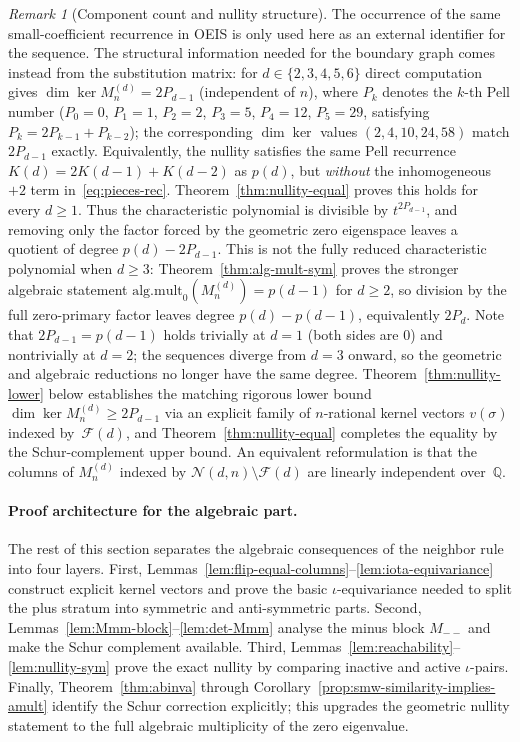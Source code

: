 \documentclass{amsart}
\theoremstyle{definition}
\theoremstyle{remark}
\newtheorem{remark}[theorem]{Remark}
\begin{document}
\begin{remark}[Component count and nullity structure]
\label{rem:nullity-structure}
The occurrence of the same small-coefficient recurrence in OEIS is
only used here as an external identifier for the sequence.  The
structural information needed for the boundary graph comes instead
from the substitution matrix:
for $d \in \{2, 3, 4, 5, 6\}$ direct computation gives
$\dim\ker M_n^{(d)} = 2 P_{d-1}$
\textup{(}independent of $n$\textup{)}, where
$P_k$ denotes the $k$-th Pell number
\textup{(}$P_0 = 0$, $P_1 = 1$, $P_2 = 2$, $P_3 = 5$,
$P_4 = 12$, $P_5 = 29$, satisfying $P_k = 2 P_{k-1} + P_{k-2}$\textup{)};
the corresponding $\dim\ker$ values $(2, 4, 10, 24, 58)$ match
$2 P_{d-1}$ exactly\@.  Equivalently, the nullity
satisfies the same Pell recurrence
$K(d) = 2 K(d{-}1) + K(d{-}2)$ as $p(d)$, but \emph{without} the
inhomogeneous $+2$ term in~\eqref{eq:pieces-rec}.  Theorem~\ref{thm:nullity-equal}
proves this holds for every $d \ge 1$.  Thus the characteristic
polynomial is divisible by $t^{2P_{d-1}}$, and removing only the
factor forced by the geometric zero eigenspace leaves a quotient
of degree $p(d) - 2 P_{d-1}$.  This is not the fully reduced
characteristic polynomial when $d \ge 3$: Theorem~\ref{thm:alg-mult-sym}
proves the stronger algebraic statement
$\mathrm{alg.mult}_0(M_n^{(d)})=p(d{-}1)$ for $d \ge 2$, so
division by the full zero-primary factor leaves degree
$p(d)-p(d{-}1)$, equivalently $2 P_d$.  Note that $2 P_{d-1} = p(d{-}1)$ holds
trivially at $d = 1$ (both sides are $0$) and nontrivially at
$d = 2$; the sequences diverge from $d = 3$ onward, so the
geometric and algebraic reductions no longer have the same
degree.
Theorem~\ref{thm:nullity-lower} below establishes the matching
rigorous lower bound $\dim \ker M_n^{(d)} \ge 2 P_{d-1}$ via
an explicit family of $n$-rational kernel vectors $v(\sigma)$
indexed by~$\mathcal{F}(d)$, and Theorem~\ref{thm:nullity-equal}
completes the equality by the Schur-complement upper bound.  An
equivalent reformulation is that the columns of $M_n^{(d)}$
indexed by $\mathcal{N}(d, n) \setminus \mathcal{F}(d)$ are
linearly independent over~$\mathbb{Q}$.
\end{remark}

\paragraph{Proof architecture for the algebraic part.}
The rest of this section separates the algebraic consequences of
the neighbor rule into four layers.  First, Lemmas~\ref{lem:flip-equal-columns}--\ref{lem:iota-equivariance}
construct explicit kernel vectors and prove the basic
$\iota$-equivariance needed to split the plus stratum into
symmetric and anti-symmetric parts.  Second,
Lemmas~\ref{lem:Mmm-block}--\ref{lem:det-Mmm} analyse the
minus block $M_{--}$ and make the Schur complement available.
Third, Lemmas~\ref{lem:reachability}--\ref{lem:nullity-sym}
prove the exact nullity by comparing inactive and active
$\iota$-pairs.  Finally,
Theorem~\ref{thm:abinva} through
Corollary~\ref{prop:smw-similarity-implies-amult} identify the
Schur correction explicitly; this upgrades the geometric nullity
statement to the full algebraic multiplicity of the zero
eigenvalue.
\end{document}
